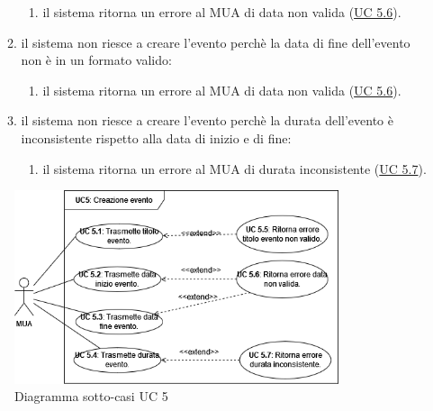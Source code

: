 \begin{itemize}
\begin{enumerate}[label=\alph*.]
            \begin{enumerate}[label=\arabic*.]
                \item il sistema ritorna un errore al MUA di data non valida (\hyperref[sec:UC5.6]{UC 5.6}).
            \end{enumerate}
            \item il sistema non riesce a creare l'evento perchè la data di fine dell'evento non è in un formato valido:
            \begin{enumerate}[label=\arabic*.]
                \item il sistema ritorna un errore al MUA di data non valida (\hyperref[sec:UC5.6]{UC 5.6}).
            \end{enumerate}
            \item il sistema non riesce a creare l'evento perchè la durata dell'evento è inconsistente rispetto alla data di inizio e di fine:
            \begin{enumerate}[label=\arabic*.]
                \item il sistema ritorna un errore al MUA di durata inconsistente (\hyperref[sec:UC5.7]{UC 5.7}).
            \end{enumerate}
        \end{enumerate}
    \end{itemize}

\begin{figure}[H]
    \includegraphics[width=0.85\textwidth]{sections/uc_imgs/UC05.png}
    \centering
    \caption{Diagramma sotto-casi UC 5}
\end{figure}


